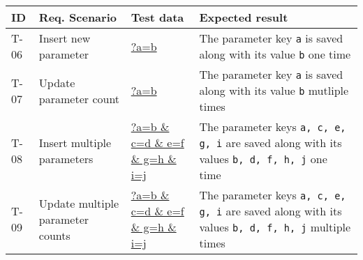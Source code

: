 \begin{tabularx}{\textwidth}{p{} p{} p{} p{}}
  \caption{Test definitions for upserting parameters}                                                                                                                                                                                                                                                                                                                                                                          \\
  \toprule
  \textbf{ID} & \textbf{Req. Scenario}                                & \textbf{Test data} & \textbf{Expected result}                                                                                                                                                                                                                                                                                                          \\
  \midrule
  T-06        & Insert new parameter                                  & \url{?a=b}         & The parameter key \texttt{a} is saved along with its value \texttt{b} one time                                                                                                                                                                                                                                                    \\
  \midrule
  T-07        & Update parameter count                                & \url{?a=b}         & The parameter key \texttt{a} is saved along with its value \texttt{b} mutliple times                                                                                                                                                                                                                                              \\
  \midrule
  T-08        & Insert multiple parameters                            & \url{?a=b          & c=d                                                                                  & e=f                                                                                                         & g=h & i=j} & The parameter keys \texttt{a, c, e, g, i} are saved along with its values \texttt{b, d, f, h, j} one time       \\
  \midrule
  T-09        & Update multiple parameter counts                      & \url{?a=b          & c=d                                                                                  & e=f                                                                                                         & g=h & i=j} & The parameter keys \texttt{a, c, e, g, i} are saved along with its values \texttt{b, d, f, h, j} multiple times \\

\end{tabularx}
